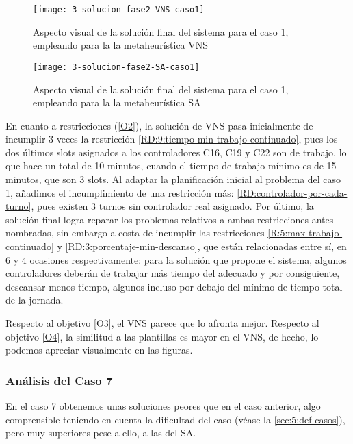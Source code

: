\begin{figure}
	\centering
	\texttt{[image: 3-solucion-fase2-VNS-caso1]}
	\caption{Aspecto visual de la solución final del sistema para el caso 1, empleando para la \fasedos{} la metaheurística VNS}
	\label{fig:5:solucion-fase2-vns-caso1}
\end{figure}

\begin{figure} 
	\centering
	\texttt{[image: 3-solucion-fase2-SA-caso1]}
	\caption{Aspecto visual de la solución final del sistema para el caso 1, empleando para la \fasedos{} la metaheurística SA}
	\label{fig:5:solucion-fase2-sa-caso1}
\end{figure}

En cuanto a restricciones (\ref{O2}), la solución de VNS pasa inicialmente de incumplir 3 veces la restricción \ref{RD:9:tiempo-min-trabajo-continuado}, pues los dos últimos slots asignados a los controladores C16, C19 y C22 son de trabajo, lo que hace un total de 10 minutos, cuando el tiempo de trabajo mínimo es de 15 minutos, que son 3 slots.
Al adaptar la planificación inicial al problema del caso 1, añadimos el incumplimiento de una restricción más: \ref{RD:controlador-por-cada-turno}, pues existen 3 turnos sin controlador real asignado.
Por último, la solución final logra reparar los problemas relativos a ambas restricciones antes nombradas, sin embargo a costa de incumplir las restricciones \ref{R:5:max-trabajo-continuado} y \ref{RD:3:porcentaje-min-descanso}, que están relacionadas entre sí, en 6 y 4 ocasiones respectivamente: para la solución que propone el sistema, algunos controladores deberán de trabajar más tiempo del adecuado y por consiguiente, descansar menos tiempo, algunos incluso por debajo del mínimo de tiempo total de la jornada.

Respecto al objetivo \ref{O3}, el VNS parece que lo afronta mejor. 
Respecto al objetivo \ref{O4}, la similitud a las plantillas es mayor en el VNS, de hecho, lo podemos apreciar visualmente en las figuras.

\subsubsection{Análisis del Caso 7}

En el caso 7 obtenemos unas soluciones peores que en el caso anterior, algo comprensible teniendo en cuenta la dificultad del caso (véase la \autoref{sec:5:def-casos}), pero muy superiores pese a ello, a las del SA. 

